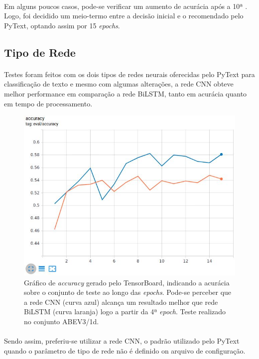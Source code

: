 \documentclass[grad,numbers]{coppe}
\begin{document}
		  	\paragraph{}Em alguns poucos casos, pode-se verificar um aumento de acurácia após a 10ª . Logo, foi decidido um meio-termo entre a decisão inicial e o recomendado pelo PyText, optando assim por 15 \textit{epochs}.
		  \subsection{Tipo de Rede}
			  \paragraph{}Testes foram feitos com os dois tipos de redes neurais oferecidas pelo PyText para classificação de texto e mesmo com algumas alterações, a rede CNN obteve melhor performance em comparação a rede BiLSTM, tanto em acurácia quanto em tempo de processamento.
				\begin{figure}[H]
					\centering
					{\includegraphics[width=13.5cm]{nn-type-graph}
						\caption{Gráfico de \textit{accuracy} gerado pelo TensorBoard, indicando a acurácia sobre o conjunto de teste ao longo das \textit{epochs}. Pode-se perceber que a rede CNN (curva azul) alcança um resultado melhor que rede BiLSTM (curva laranja) logo a partir da 4ª \textit{epoch}. Teste realizado no conjunto ABEV3/1d.}
						\label{fig:nn-type-graph-fig}}
				\end{figure}
			  \paragraph{}Sendo assim, preferiu-se utilizar a rede CNN, o padrão utilizado pelo PyText quando o parâmetro de tipo de rede não é definido on arquivo de configuração.
\end{document}
